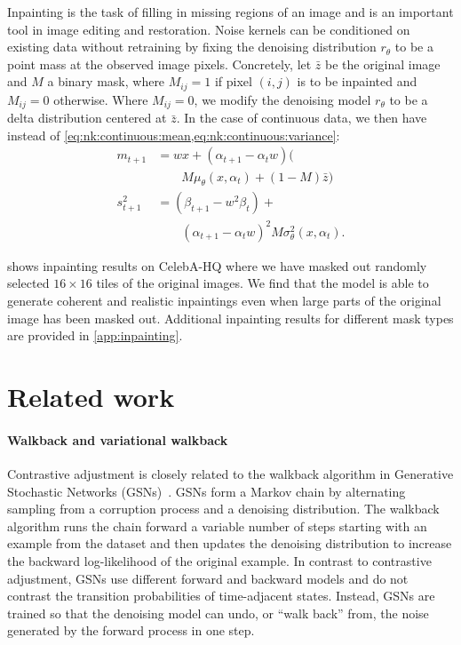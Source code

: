 \documentclass[10pt,twocolumn,letterpaper]{article}
\begin{document}
Inpainting is the task of filling in missing regions of an image and is an important tool in image editing and restoration.
Noise kernels can be conditioned on existing data without retraining by fixing the denoising distribution $r_{\theta}$ to be a point mass at the observed image pixels.
Concretely, let $\bar{z}$ be the original image and $M$ a binary mask, where $M_{ij} = 1$ if pixel $(i, j)$ is to be inpainted and $M_{ij} = 0$ otherwise.
Where $M_{ij} = 0$, we modify the denoising model $r_{\theta}$ to be a delta distribution centered at $\bar{z}$.
In the case of continuous data, we then have instead of \cref{eq:nk:continuous:mean,eq:nk:continuous:variance}:
\begin{align}
  m_{t+1}
  & = w x + (\alpha_{t+1} - \alpha_{t}w) (
    \nonumber \\
  & \qquad
    M \mu_{\theta}(x, \alpha_{t}) + (1 - M) \bar{z} )
  \\
  s_{t+1}^{2}
  & = (\beta_{t+1} - w^{2}\beta_{t}) +
    \nonumber \\
  & \qquad
    (\alpha_{t+1} - \alpha_{t}w)^{2} M \sigma^{2}_{\theta}(x, \alpha_{t})
    .
\end{align}

 shows inpainting results on CelebA-HQ where we have masked out randomly selected $16 \times 16$ tiles of the original images.
We find that the model is able to generate coherent and realistic inpaintings even when large parts of the original image has been masked out.
Additional inpainting results for different mask types are provided in \cref{app:inpainting}.


\section{Related work}

\paragraph{Walkback and variational walkback}

Contrastive adjustment is closely related to the walkback algorithm in Generative Stochastic Networks (GSNs)~\cite{alain15_gsns}.
GSNs form a Markov chain by alternating sampling from a corruption process and a denoising distribution.
The walkback algorithm runs the chain forward a variable number of steps starting with an example from the dataset and then updates the denoising distribution to increase the backward log-likelihood of the original example.
In contrast to contrastive adjustment, GSNs use different forward and backward models and do not contrast the transition probabilities of time-adjacent states.
Instead, GSNs are trained so that the denoising model can undo, or ``walk back'' from, the noise generated by the forward process in one step.
\end{document}

